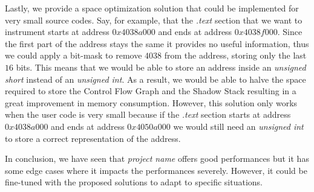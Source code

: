 Lastly, we provide a space optimization solution that could be implemented for
very small source codes. Say, for example, that the \textit{.text} section that
we want to instrument starts at address $0x4038a000$ and ends at address
$0x4038f000$. Since the first part of the address stays the same it provides no useful
information, thus we could apply a bit-mask to remove $4038$ from the address, storing
only the last $16$ bits. This means that we would be able to store an address
inside an \textit{unsigned short} instead of an \textit{unsigned int}. As a result,
we would be able to halve the space required to store the Control Flow Graph and
the Shadow Stack resulting in a great improvement in memory consumption. However,
this solution only works when the user code is very small because if the \textit{.text}
section starts at address $0x4038a000$ and ends at address $0x4050a000$ we would
still need an \textit{unsigned int} to store a correct representation of the
address.

In conclusion, we have seen that \textit{project name} offers good performances
but it has some edge cases where it impacts the performances severely. However,
it could be fine-tuned with the proposed solutions to adapt to specific
situations.
